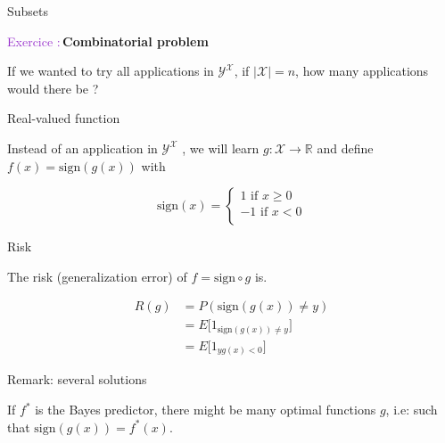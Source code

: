 \documentclass[usenames,dvipsnames]{beamer}
\newcounter{numexos}%
\newcommand{\exercice}[1]{%
\addtocounter{numexos}{1}%
\textcolor{DarkOrchid}{Exercice\,\thenumexos\,:}\,#1%
}
\begin{document}
\begin{frame}{Subsets}

    \exercice{\textbf{Combinatorial problem}}

    If we wanted to try all applications in $ \mathcal{Y}^{ \mathcal{X}}$, if $ | \mathcal{X} |=n$, how many applications would there be ?
    
\end{frame}

\begin{frame}{Real-valued function}

    Instead of an application in  $ \mathcal{Y}^{ \mathcal{X} }$ , we will learn $g: \mathcal{X} \rightarrow \mathbb{R} $ and define $ f(x) = \text{sign}(g(x))$ with
    
         $$
	    \text{sign}(x) = \left\{
                \begin{array}{ll}
                    1 \text{ if } x\geq 0   \\
		    -1 \text{ if } x<0   \\
                \end{array}
                \right.
                $$
\end{frame}

\begin{frame}{Risk}

    The risk (generalization error) of $f = \text{sign} \circ g$ is.

    \begin{equation}
        \begin{aligned}
            \label{eq:}
	    R(g) &= P( \text{sign}(g(x))\neq y)\\
	    &= E\Big[1_{\text{sign}(g(x))\neq y} \Big]\\
	    &= E\Big[ 1_{yg(x)<0} \Big]
        \end{aligned}
    \end{equation}
\end{frame}

\begin{frame}{Remark: several solutions}

    If $f^*$ is the Bayes predictor, there might be many optimal functions $g$, i.e: such that $ \text{sign}(g(x)) = f^*(x)$.
    
\end{frame}
\end{document}
